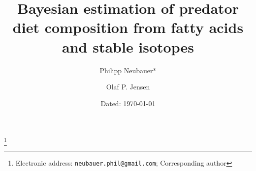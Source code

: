 \documentclass[12pt]{article}%
\begin{document}
%
\begin{titlepage}%
\title{Bayesian estimation of predator diet composition from fatty
  acids and stable isotopes}%

\author{Philipp Neubauer*}
\thanks{Electronic address: \texttt{neubauer.phil@gmail.com}; Corresponding author}%
%

\author{Olaf P. Jensen}%
%

\date{Dated: \today}%

\maketitle%

\end{titlepage}
\end{document}
